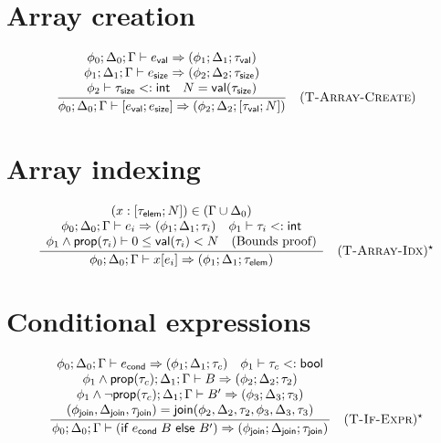 \section*{Array creation}

$$
  \frac{
    \begin{array}{c}
      \phi_0; \Delta_0; \Gamma \vdash e_\textsf{val} \Rightarrow (\phi_1; \Delta_1; \tau_\textsf{val})   \\
      \phi_1; \Delta_1; \Gamma \vdash e_\textsf{size} \Rightarrow (\phi_2; \Delta_2; \tau_\textsf{size}) \\
      \phi_2 \vdash \tau_\textsf{size} <: \textsf{int} \quad N = \textsf{val}(\tau_\textsf{size})
    \end{array}
  }{
    \phi_0; \Delta_0; \Gamma \vdash [e_\textsf{val}; e_\textsf{size}] \Rightarrow (\phi_2; \Delta_2; [\tau_\textsf{val}; N])
  } \quad (\textsc{T-Array-Create})
$$

\section*{Array indexing}

$$
  \frac{
    \begin{array}{c}
      (x: [\tau_\textsf{elem}; N]) \in (\Gamma \cup \Delta_0)                                                               \\
      \phi_0; \Delta_0; \Gamma \vdash e_i \Rightarrow (\phi_1; \Delta_1; \tau_i) \quad \phi_1 \vdash \tau_i <: \textsf{int} \\
      \phi_1 \wedge \textsf{prop}(\tau_i) \vdash 0 \le \textsf{val}(\tau_i) < N \quad \text{(Bounds proof)}
    \end{array}
  }{
    \phi_0; \Delta_0; \Gamma \vdash x[e_i] \Rightarrow (\phi_1; \Delta_1; \tau_\textsf{elem})
  } \quad (\textsc{T-Array-Idx})^\star
$$

\section*{Conditional expressions}

$$
  \frac{
    \begin{array}{c}
      \phi_0; \Delta_0; \Gamma \vdash e_\textsf{cond} \Rightarrow (\phi_1; \Delta_1; \tau_c) \quad \phi_1 \vdash \tau_c <: \textsf{bool} \\
      \phi_1 \wedge \textsf{prop}(\tau_c); \Delta_1; \Gamma \vdash B \Rightarrow (\phi_2; \Delta_2; \tau_2)                              \\
      \phi_1 \wedge \neg \textsf{prop}(\tau_c); \Delta_1; \Gamma \vdash B' \Rightarrow (\phi_3; \Delta_3; \tau_3)                        \\
      (\phi_\textsf{join}, \Delta_\textsf{join}, \tau_\textsf{join}) = \textsf{join}(\phi_2, \Delta_2, \tau_2, \phi_3, \Delta_3, \tau_3)
    \end{array}
  }{
    \phi_0; \Delta_0; \Gamma \vdash (\textsf{if } e_\textsf{cond}\; B \textsf{ else } B') \Rightarrow (\phi_\textsf{join}; \Delta_\textsf{join}; \tau_\textsf{join})
  } \quad (\textsc{T-If-Expr})^\star
$$

